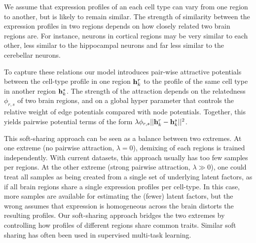 \documentclass{article} %
\begin{document}
We assume that expression profiles of an each cell type can vary from one region to another, but is likely to remain similar. The strength of similarity between the expression profiles in two regions depends on how closely related two brain regions are. For instance, neurons in cortical regions may be very similar to each other, less similar to the hippocampal neurons and far less similar to the cerebellar neurons. 

To capture these relations our model introduces pair-wise attractive potentials between the cell-type profile in one region $\mathbf{h}^r_k$ to the profile of the same cell type in another region $\mathbf{h}^s_k$. The strength of the attraction depends on the relatedness $\phi_{r,s}$ of two brain regions, and on a global hyper parameter that controls the relative weight of edge potentials compared with node potentials. Together, this yields pairwise potential terms of the form 
$\lambda \phi_{r,s}|| \mathbf{h}^r_k - \mathbf{h}^s_k||^2$.

This soft-sharing approach can be seen as a balance between two extremes. At one extreme (no pairwise attraction, $\lambda=0$), demixing of each regions is trained independently. With current datasets, this approach usually has too few samples per regions.  At the other extreme (strong pairwise attraction, $\lambda \gg 0$), one could treat all samples as being created from a single set of underlying latent factors, as if all brain regions share a single expression profiles per cell-type. In this case, more samples are available for estimating the (fewer) latent factors, but the wrong assumes that expression is homogeneous across the brain   distorts the resulting profiles. Our soft-sharing approach bridges the two extremes by controlling how profiles of different regions share common traits. Similar soft sharing has often been used in supervised multi-task learning. 
\end{document}
